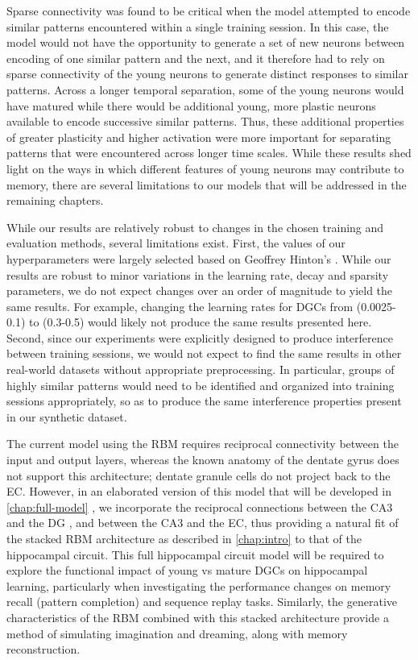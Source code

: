 Sparse connectivity was found to be
critical when the model attempted to encode similar patterns encountered
within a single training session. 
In this case, the model would not have the
opportunity to generate a set of new neurons between encoding of one similar
pattern and the next, and it therefore had to rely on sparse connectivity of
the young neurons to generate distinct responses to similar patterns. 
Across a longer temporal separation, some of the young neurons would have matured while
there would be additional young, more plastic neurons available to encode
successive similar patterns. 
Thus, these additional properties of greater
plasticity and higher activation were more important for separating patterns
that were encountered across longer time scales. 
While these results shed light on the ways in which different features of
young neurons may contribute to memory, there are several limitations to our
models that will be addressed in the remaining chapters.

While our results are relatively robust to changes in the chosen training and 
evaluation methods, several limitations exist.
First, the values of our hyperparameters were largely selected based on 
Geoffrey Hinton's  \citeyearpar{training_rbms}.
While our results are robust to minor variations in the learning rate, decay and sparsity 
parameters, we do not expect changes over an order of magnitude to yield the same results.
For example, changing the learning rates for \acp{DGC} from (0.0025-0.1) to 
(0.3-0.5) would likely not produce the same results presented here.
Second, since our experiments were explicitly designed to produce interference between 
training sessions, we would not expect to find the same results in other real-world datasets 
without appropriate preprocessing.
In particular, groups of highly similar patterns would need to be identified and organized into 
training sessions appropriately, so as to produce the same interference properties 
present in our synthetic dataset.

The current model using the \ac{RBM} requires reciprocal connectivity 
between the input and output layers, whereas the known anatomy of the dentate gyrus 
does not support this architecture; dentate granule cells do not project back to 
the \ac{EC}. 
However, in an elaborated version of this 
model that will be developed in \cref{chap:full-model} \citep{becker-hinton-SFN-abstract}, 
we incorporate the reciprocal connections between the CA3 and the \ac{DG}
\citep{CA3_DG_backprojections}, and between the CA3 and the \ac{EC}, 
thus providing a natural fit of the stacked \ac{RBM} architecture as described in \cref{chap:intro} to that of 
the hippocampal circuit. 
This full hippocampal circuit model will be required to explore the 
functional impact of young vs mature \acp{DGC} on hippocampal learning, particularly when 
investigating the performance changes on memory recall (pattern completion) and sequence replay tasks.  
Similarly, the generative characteristics of the \ac{RBM} combined with this stacked 
architecture provide a method of simulating imagination and dreaming, along with memory reconstruction.

